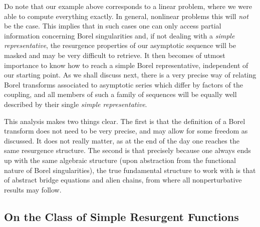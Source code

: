 \documentclass[11pt,a4paper]{article}
\begin{document}
Do note that our example above corresponds to a linear problem, where we were able to compute everything exactly. In general, nonlinear problems this will \textit{not} be the case. This implies that in such cases one can only access partial information concerning Borel singularities and, if not dealing with a \textit{simple representative}, the resurgence properties of our asymptotic sequence will be masked and may be very difficult to retrieve. It then becomes of utmost importance to know how to reach a simple Borel representative, independent of our starting point. As we shall discuss next, there is a very precise way of relating Borel transforms associated to asymptotic series which differ by factors of the coupling, and all members of such a family of sequences will be equally well described by their single \textit{simple representative}.

This analysis makes two things clear. The first is that the definition of a Borel transform does not need to be very precise, and may allow for some freedom as discussed. It does not really matter, as at the end of the day one reaches the same resurgence structure. The second is that precisely because one always ends up with the same algebraic structure (upon abstraction from the functional nature of Borel singularities), the true fundamental structure to work with is that of abstract bridge equations and alien chains, from where all nonperturbative results may follow.

\subsection*{On the Class of Simple Resurgent Functions}
\end{document}
